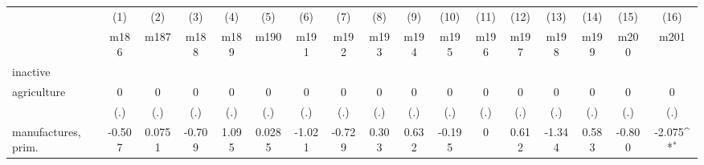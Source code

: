 {
\def\sym#1{\ifmmode^{#1}\else\(^{#1}\)\fi}
\begin{tabular}{l*{16}{c}}
\hline\hline
                    &\multicolumn{1}{c}{(1)}&\multicolumn{1}{c}{(2)}&\multicolumn{1}{c}{(3)}&\multicolumn{1}{c}{(4)}&\multicolumn{1}{c}{(5)}&\multicolumn{1}{c}{(6)}&\multicolumn{1}{c}{(7)}&\multicolumn{1}{c}{(8)}&\multicolumn{1}{c}{(9)}&\multicolumn{1}{c}{(10)}&\multicolumn{1}{c}{(11)}&\multicolumn{1}{c}{(12)}&\multicolumn{1}{c}{(13)}&\multicolumn{1}{c}{(14)}&\multicolumn{1}{c}{(15)}&\multicolumn{1}{c}{(16)}\\
                    &\multicolumn{1}{c}{m186}&\multicolumn{1}{c}{m187}&\multicolumn{1}{c}{m188}&\multicolumn{1}{c}{m189}&\multicolumn{1}{c}{m190}&\multicolumn{1}{c}{m191}&\multicolumn{1}{c}{m192}&\multicolumn{1}{c}{m193}&\multicolumn{1}{c}{m194}&\multicolumn{1}{c}{m195}&\multicolumn{1}{c}{m196}&\multicolumn{1}{c}{m197}&\multicolumn{1}{c}{m198}&\multicolumn{1}{c}{m199}&\multicolumn{1}{c}{m200}&\multicolumn{1}{c}{m201}\\
\hline
inactive            &                     &                     &                     &                     &                     &                     &                     &                     &                     &                     &                     &                     &                     &                     &                     &                     \\
agriculture         &           0         &           0         &           0         &           0         &           0         &           0         &           0         &           0         &           0         &           0         &           0         &           0         &           0         &           0         &           0         &           0         \\
                    &         (.)         &         (.)         &         (.)         &         (.)         &         (.)         &         (.)         &         (.)         &         (.)         &         (.)         &         (.)         &         (.)         &         (.)         &         (.)         &         (.)         &         (.)         &         (.)         \\
[1em]
manufactures, prim. &      -0.507         &      0.0751         &      -0.709         &       1.095         &      0.0285         &      -1.021         &      -0.729         &       0.303         &       0.632         &      -0.195         &           0         &       0.612         &      -1.344         &       0.583         &      -0.800         &      -2.075\sym{*}  \\

\end{tabular}}
